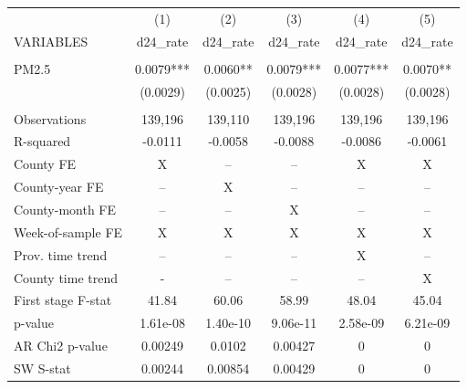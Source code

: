 \begin{tabular}{lccccc} \hline
 & (1) & (2) & (3) & (4) & (5) \\
VARIABLES & d24\_rate & d24\_rate & d24\_rate & d24\_rate & d24\_rate \\ \hline
 &  &  &  &  &  \\
PM2.5 & 0.0079*** & 0.0060** & 0.0079*** & 0.0077*** & 0.0070** \\
 & (0.0029) & (0.0025) & (0.0028) & (0.0028) & (0.0028) \\
 &  &  &  &  &  \\
Observations & 139,196 & 139,110 & 139,196 & 139,196 & 139,196 \\
R-squared & -0.0111 & -0.0058 & -0.0088 & -0.0086 & -0.0061 \\
County FE & X & -- & -- & X & X \\
County-year FE & -- & X & -- & -- & -- \\
County-month FE & -- & -- & X & -- & -- \\
Week-of-sample FE & X & X & X & X & X \\
Prov. time trend & -- & -- & -- & X & -- \\
County time trend & - & -- & -- & -- & X \\
First stage F-stat & 41.84 & 60.06 & 58.99 & 48.04 & 45.04 \\
p-value & 1.61e-08 & 1.40e-10 & 9.06e-11 & 2.58e-09 & 6.21e-09 \\
AR Chi2 p-value & 0.00249 & 0.0102 & 0.00427 & 0 & 0 \\
 SW S-stat & 0.00244 & 0.00854 & 0.00429 & 0 & 0 \\ \hline
\end{tabular}
